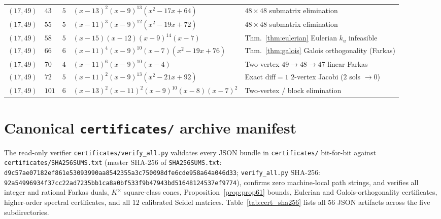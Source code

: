 \documentclass[11pt,reqno]{amsart}
\theoremstyle{definition}
\theoremstyle{remark}
\numberwithin{equation}{section}
\numberwithin{table}{section}
\begin{document}
\begin{table}[htbp]
\begin{tabular}{@{}llr>{\raggedright\arraybackslash}p{2.40in}>{\raggedright\arraybackslash}p{1.90in}@{}}
$(17,49)$ & $43$ & $5$ & $(x-13)^2(x-9)^{13}(x^2-17x+64)$ & $48\times 48$ submatrix elimination~\cite{GSY2023} \\
$(17,49)$ & $55$ & $5$ & $(x-11)^3(x-9)^{12}(x^2-19x+72)$ & $48\times 48$ submatrix elimination~\cite{GSY2023} \\
$(17,49)$ & $58$ & $5$ & $(x-15)(x-12)(x-9)^{14}(x-7)$ & Thm.~\ref{thm:eulerian} Eulerian $k_u$ infeasible \\
$(17,49)$ & $66$ & $6$ & $(x-11)^4(x-9)^{10}(x-7)(x^2-19x+76)$ & Thm.~\ref{thm:galois} Galois orthogonality (Farkas) \\
$(17,49)$ & $70$ & $4$ & $(x-11)^6(x-9)^{10}(x-4)$ & Two-vertex $49\to 48\to 47$ linear Farkas \\
$(17,49)$ & $72$ & $5$ & $(x-11)^2(x-9)^{13}(x^2-21x+92)$ & Exact $\mathrm{diff}=1$ $2$-vertex Jacobi ($2$ sols $\to 0$) \\
$(17,49)$ & $101$ & $6$ & $(x-13)^2(x-11)^2(x-9)^{10}(x-8)(x-7)^2$ & Two-vertex / block elimination~\cite{GSY2023} \\
\bottomrule
\end{tabular}
\end{table}

\section{Canonical \texorpdfstring{\texttt{certificates/}}{certificates/} archive manifest}\label{app:cert_manifest}

The read-only verifier \nolinkurl{certificates/verify_all.py} validates every JSON bundle in \nolinkurl{certificates/} bit-for-bit against \nolinkurl{certificates/SHA256SUMS.txt} (master SHA-256 of \nolinkurl{SHA256SUMS.txt}: \texttt{d9c57ae07182ef86\allowbreak 1e53093990aa8542\allowbreak 355a3c750098dfe6\allowbreak cde958a64a046d33}; \nolinkurl{verify_all.py} SHA-256: \texttt{92a54996934f37cc\allowbreak 22ad7235bb1ca8a0\allowbreak bf533f9b47943bd5\allowbreak 1648124537ef9774}), confirms zero machine-local path strings, and verifies all integer and rational Farkas duals, $K^\times$ square-class cones, Proposition~\ref{prop:prop61} bounds, Eulerian and Galois-orthogonality certificates, higher-order spectral certificates, and all $12$ calibrated Seidel matrices. Table~\ref{tab:cert_sha256} lists all $56$ JSON artifacts across the five subdirectories.
\end{document}
